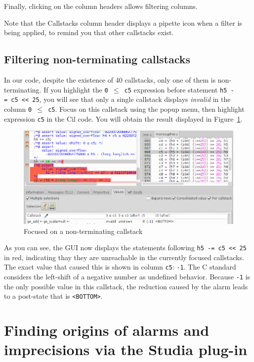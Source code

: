 Finally, clicking on the column headers allows filtering columns.

Note that the Callstacks column header displays a pipette icon when a
filter is being applied, to remind you that other callstacks exist.

\subsection{Filtering non-terminating callstacks}
\label{filtering-non-terminating-callstacks}

In our code, despite the existence of 40 callstacks, only one of them is
non-terminating. If you highlight the \texttt{0\ $\le$\ c5} expression
before statement \texttt{h5\ -=\ c5\ \textless{}\textless{}\ 25}, you
will see that only a single callstack displays \emph{invalid} in the
column \texttt{0\ $\le$\ c5}. Focus on this callstack using the popup menu,
then highlight expression \texttt{c5} in the Cil code. You will obtain
the result displayed in Figure~\ref{fig:non-term-callstack}.

\begin{figure}[hbt]
\centering
\includegraphics[width=\textwidth]{gui-images/gui5.png}
\caption{Focused on a non-terminating callstack}
\label{fig:non-term-callstack}
\end{figure}

As you can see, the GUI now displays the statements following
\texttt{h5\ -=\ c5\ \textless{}\textless{}\ 25} in red, indicating thay
they are unreachable in the currently focused callstacks. The exact
value that caused this is shown in column \texttt{c5}: \texttt{-1}. The
C standard considers the left-shift of a negative number as undefined
behavior. Because \texttt{-1} is the only possible value in this
callstack, the reduction caused by the alarm leads to a post-state that
is \texttt{\textless{}BOTTOM\textgreater{}}.

\section{Finding origins of alarms and imprecisions via the Studia plug-in}
\label{studia}

